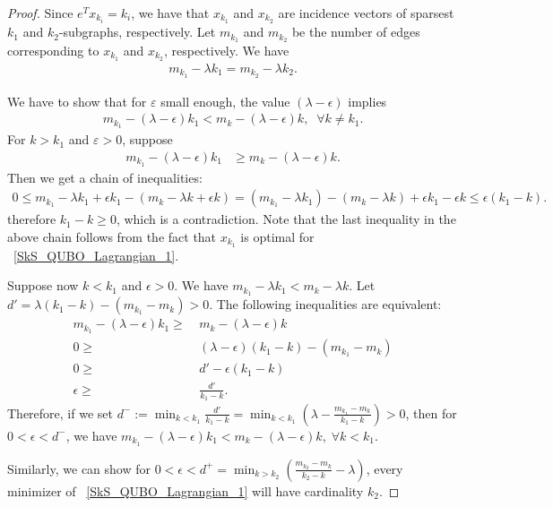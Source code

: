 \documentclass{article}
\begin{document}
\begin{proof}
Since $e^Tx_{k_i}=k_i$, we have that $x_{k_1}$ and $x_{k_2}$  are incidence vectors of  sparsest  $k_1$ and $k_2$-subgraphs, respectively.
 Let $ m_{k_1}$ and  $ m_{k_2}$ be the number of edges corresponding to $x_{k_1}$ and $x_{k_2}$, respectively.
We have 
\begin{align*}
    m_{k_1}-\lambda k_1 =  m_{k_2} -\lambda k_2. 
\end{align*}

We have to show that for $\varepsilon$ small enough, the value $(\lambda-\epsilon)$ implies
\begin{align*}
    m_{k_1} - (\lambda-\epsilon)k_1 < m_{k} - (\lambda-\epsilon)k,\;\; \forall k  \neq k_1.
\end{align*} 
For $k > k_1$ and $\varepsilon >0$, suppose  
\begin{align*}
m_{k_1} - (\lambda-\epsilon)k_1 &\ge  m_{k} - (\lambda-\epsilon)k.
\end{align*}
Then we get a chain  of  inequalities: 
\begin{align*}
0\le 
m_{k_1} - \lambda k_1 + \epsilon k_1 -(  m_{k} - \lambda k + \epsilon k) =
     (m_{k_1} - \lambda k_1) - (m_{k} - \lambda k)+ \epsilon k_1 - \epsilon k \le 
    \epsilon (k_1 - k). 
\end{align*}
therefore $k_1 - k\ge 0$, which is a  
contradiction. Note that the last inequality in the above chain follows from the fact that $x_{k_1}$ is optimal for ~\eqref{SkS_QUBO_Lagrangian_1}.

Suppose  now $k < k_1$ and $\epsilon>0$.
We have $m_{k_1} - \lambda k_1 < m_{k} - \lambda k$. Let $d' = \lambda(k_1-k) - (m_{k_1} - m_k) > 0$. The following  inequalities are equivalent:
\begin{align*}
    m_{k_1} - (\lambda - \epsilon)k_1 \ge & ~m_k - (\lambda - \epsilon)k \\
    0 \ge & ~ (\lambda - \epsilon)(k_1-k) - (m_{k_1} - m_k)\\
    0 \ge & ~ d' - \epsilon(k_1-k)\\
    \epsilon \ge  & ~ \frac{d'}{k_1 - k}.
\end{align*}
Therefore, if we set 
$  d^-:=
 \min_{k<k_1} \frac{d'}{k_1 - k} = \min_{k<k_1} \left( \lambda - \frac{m_{k_1} - m_{k}}{k_1 - k} \right) > 0$, then for $0<\epsilon<d^-$, we have $m_{k_1} - (\lambda-\epsilon)k_1 < m_{k} - (\lambda-\epsilon)k,\; \forall k < k_1$.

Similarly, we can show for $0<\epsilon<d^+=\min_{k>k_2} \left( \frac{m_{k_2} - m_{k}}{k_2 - k} - \lambda \right)$, every minimizer of ~\eqref{SkS_QUBO_Lagrangian_1} will have cardinality $k_2$.
\end{proof}
\end{document}
